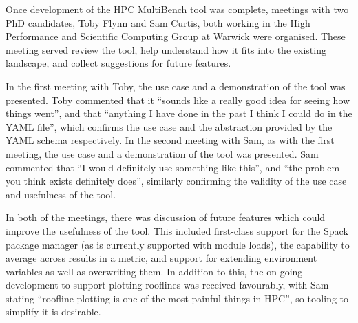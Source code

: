 Once development of the HPC MultiBench tool was complete, meetings with two PhD candidates, Toby Flynn and Sam Curtis, both working in the High Performance and Scientific Computing Group at Warwick were organised. These meeting served review the tool, help understand how it fits into the existing landscape, and collect suggestions for future features.

In the first meeting with Toby, the use case and a demonstration of the tool was presented. Toby commented that it ``sounds like a really good idea for seeing how things went'', and that ``anything I have done in the past I think I could do in the YAML file'', which confirms the use case and the abstraction provided by the YAML schema respectively. In the second meeting with Sam, as with the first meeting, the use case and a demonstration of the tool was presented. Sam commented that ``I would definitely use something like this'', and ``the problem you think exists definitely does'', similarly confirming the validity of the use case and usefulness of the tool.


In both of the meetings, there was discussion of future features which could improve the usefulness of the tool. This included first-class support for the Spack package manager (as is currently supported with module loads), the capability to average across results in a metric, and support for extending environment variables as well as overwriting them. In addition to this, the on-going development to support plotting rooflines was received favourably, with Sam stating ``roofline plotting is one of the most painful things in HPC'', so tooling to simplify it is desirable.